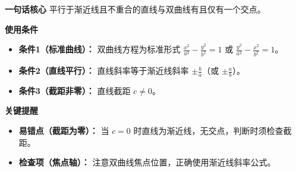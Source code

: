 \begin{summarybox}
	\textbf{\textcolor{CSummary}{一句话核心}}
	平行于渐近线且不重合的直线与双曲线有且仅有一个交点。

	\medskip
	\textbf{\textcolor{CSummary}{使用条件}}
	\begin{itemize}[leftmargin=*, itemsep=0.5em, topsep=0.4em]
		\item \textbf{条件1（标准曲线）：} 双曲线方程为标准形式 $\frac{x^2}{a^2}-\frac{y^2}{b^2}=1$ 或 $\frac{y^2}{a^2}-\frac{x^2}{b^2}=1$。
		\item \textbf{条件2（直线平行）：} 直线斜率等于渐近线斜率 $\pm\frac{b}{a}$（或 $\pm\frac{a}{b}$）。
		\item \textbf{条件3（截距非零）：} 直线截距 $c\neq0$。
	\end{itemize}

	\medskip
	\textbf{\textcolor{CSummary}{关键提醒}}
	\begin{itemize}[leftmargin=*, itemsep=0.5em, topsep=0.4em]
		\item \textbf{易错点（截距为零）：} 当 $c=0$ 时直线为渐近线，无交点，判断时须检查截距。
		\item \textbf{检查项（焦点轴）：} 注意双曲线焦点位置，正确使用渐近线斜率公式。
	\end{itemize}

\end{summarybox}
